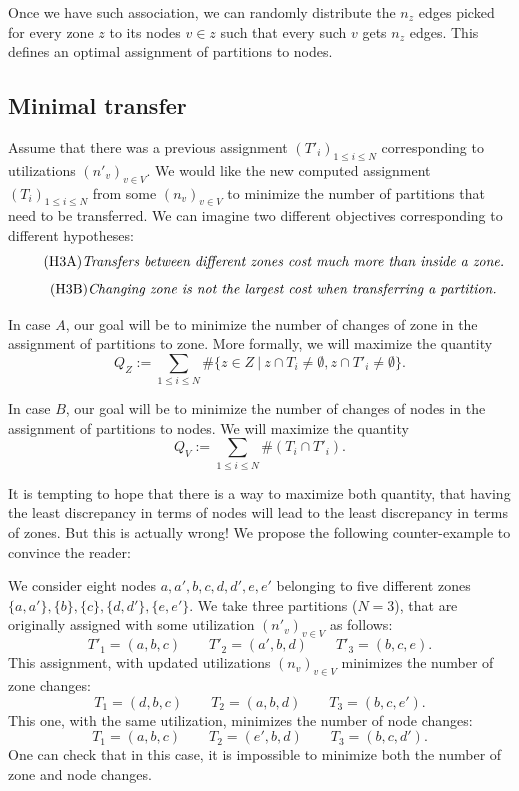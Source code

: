 \documentclass[]{article}
\begin{document}
Once we have such association, we can randomly distribute the $n_z$ edges picked for every zone $z$ to its nodes $v\in z$ such that every such $v$ gets $n_z$ edges. This defines an optimal assignment of partitions to nodes.


\subsection{Minimal transfer}

Assume that there was a previous assignment $(T'_i)_{1\le i\le N}$ corresponding to utilizations $(n'_v)_{v\in V}$. We would like the new computed assignment $(T_i)_{1\le i\le N}$ from some $(n_v)_{v\in V}$ to minimize the number of partitions that need to be transferred. We can imagine two different objectives corresponding to different hypotheses: 
\begin{equation}
	\tag{H3A}
	\label{hyp:A}
	\text{\emph{Transfers between different zones cost much more than inside a zone.}}
\end{equation}
\begin{equation}
	\tag{H3B}
	\label{hyp:B}
	\text{\emph{Changing zone is not the largest cost when transferring a partition.}}
\end{equation}

In case $A$, our goal will be to minimize the number of changes of zone in the assignment of partitions to zone. More formally, we will maximize the quantity
$$
Q_Z := 
\sum_{1\le i\le N} 
\#\{z\in Z ~|~ z\cap T_i \neq \emptyset, z\cap T'_i \neq \emptyset \}
.$$

In case $B$, our goal will be to minimize the number of changes of nodes in the assignment of partitions to nodes. We will maximize the quantity
$$
Q_V :=
\sum_{1\le i\le N} \#(T_i \cap T'_i).
$$

It is tempting to hope that there is a way to maximize both quantity, that having the least discrepancy in terms of nodes will lead to the least discrepancy in terms of zones. But this is actually wrong! We propose the following counter-example to convince the reader:

We consider eight nodes $a, a', b, c, d, d', e, e'$ belonging to five different zones $\{a,a'\}, \{b\}, \{c\}, \{d,d'\}, \{e, e'\}$. We take three partitions ($N=3$), that are originally assigned with some utilization $(n'_v)_{v\in V}$ as follows:
$$
T'_1=(a,b,c) \qquad
T'_2=(a',b,d) \qquad 
T'_3=(b,c,e).
$$
This assignment, with updated utilizations $(n_v)_{v\in V}$ minimizes the number of zone changes:
$$
T_1=(d,b,c) \qquad
T_2=(a,b,d) \qquad 
T_3=(b,c,e').
$$
This one, with the same utilization, minimizes the number of node changes:
$$
T_1=(a,b,c) \qquad
T_2=(e',b,d) \qquad 
T_3=(b,c,d').
$$
One can check that in this case, it is impossible to minimize both the number of zone and node changes.
\end{document}
